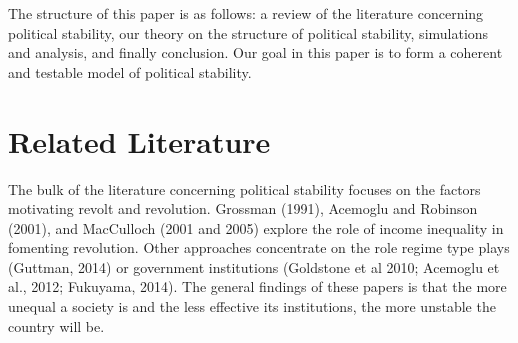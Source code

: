 \documentclass[12pt]{article}
\begin{document}
\begin{spacing}{1.5}


The structure of this paper is as follows: a review of the literature concerning political stability, our theory on the structure of political stability, simulations and analysis, and finally conclusion. Our goal in this paper is to form a coherent and testable model of political stability.   

\section{Related Literature}

The bulk of the literature concerning political stability focuses on the factors motivating revolt and revolution. Grossman (1991), Acemoglu and Robinson (2001), and MacCulloch (2001 and 2005) explore the role of income inequality in fomenting revolution. Other approaches concentrate on the role regime type plays (Guttman, 2014) or government institutions (Goldstone et al 2010; Acemoglu et al., 2012; Fukuyama, 2014). The general findings of these papers is that the more unequal a society is and the less effective its institutions, the more unstable the country will be. 


\end{spacing}
\end{document}
